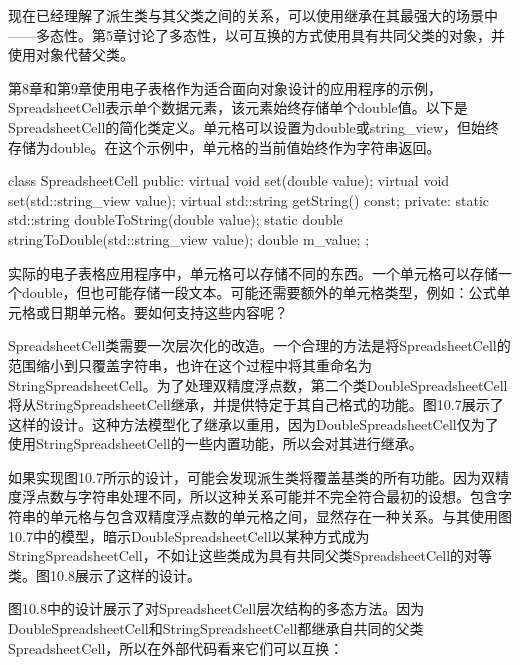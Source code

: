 
现在已经理解了派生类与其父类之间的关系，可以使用继承在其最强大的场景中——多态性。第5章讨论了多态性，以可互换的方式使用具有共同父类的对象，并使用对象代替父类。


第8章和第9章使用电子表格作为适合面向对象设计的应用程序的示例，SpreadsheetCell表示单个数据元素，该元素始终存储单个double值。以下是SpreadsheetCell的简化类定义。单元格可以设置为double或string\_view，但始终存储为double。在这个示例中，单元格的当前值始终作为字符串返回。

\begin{cpp}
class SpreadsheetCell
{
    public:
        virtual void set(double value);
        virtual void set(std::string_view value);
        virtual std::string getString() const;
    private:
        static std::string doubleToString(double value);
        static double stringToDouble(std::string_view value);
        double m_value;
};
\end{cpp}

实际的电子表格应用程序中，单元格可以存储不同的东西。一个单元格可以存储一个double，但也可能存储一段文本。可能还需要额外的单元格类型，例如：公式单元格或日期单元格。要如何支持这些内容呢？


SpreadsheetCell类需要一次层次化的改造。一个合理的方法是将SpreadsheetCell的范围缩小到只覆盖字符串，也许在这个过程中将其重命名为StringSpreadsheetCell。为了处理双精度浮点数，第二个类DoubleSpreadsheetCell将从StringSpreadsheetCell继承，并提供特定于其自己格式的功能。图10.7展示了这样的设计。这种方法模型化了继承以重用，因为DoubleSpreadsheetCell仅为了使用StringSpreadsheetCell的一些内置功能，所以会对其进行继承。


如果实现图10.7所示的设计，可能会发现派生类将覆盖基类的所有功能。因为双精度浮点数与字符串处理不同，所以这种关系可能并不完全符合最初的设想。包含字符串的单元格与包含双精度浮点数的单元格之间，显然存在一种关系。与其使用图10.7中的模型，暗示DoubleSpreadsheetCell以某种方式成为StringSpreadsheetCell，不如让这些类成为具有共同父类SpreadsheetCell的对等类。图10.8展示了这样的设计。


图10.8中的设计展示了对SpreadsheetCell层次结构的多态方法。因为DoubleSpreadsheetCell和StringSpreadsheetCell都继承自共同的父类SpreadsheetCell，所以在外部代码看来它们可以互换：

